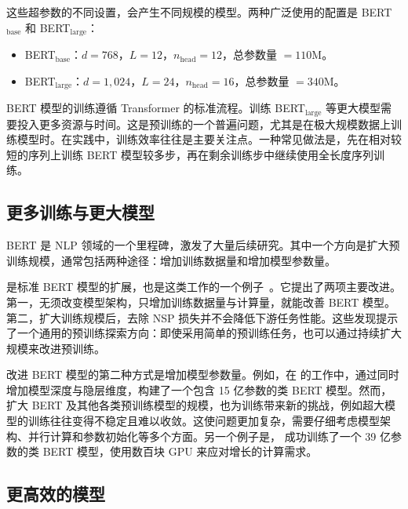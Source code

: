这些超参数的不同设置，会产生不同规模的模型。两种广泛使用的配置是 BERT$_{\mathrm{base}}$ 和 BERT$_{\mathrm{large}}$：

\begin{itemize}
\item \vspace{0.5em} BERT$_{\mathrm{base}}$：$d=768$，$L=12$，$n_{\mathrm{head}}=12$，总参数量 $=110$M。
\item \vspace{0.3em} BERT$_{\mathrm{large}}$：$d=1,024$，$L=24$，$n_{\mathrm{head}}=16$，总参数量 $=340$M。
\end{itemize}
\vspace{0.3em}

BERT 模型的训练遵循 Transformer 的标准流程。训练 BERT$_{\mathrm{large}}$ 等更大模型需要投入更多资源与时间。这是预训练的一个普遍问题，尤其是在极大规模数据上训练模型时。在实践中，训练效率往往是主要关注点。一种常见做法是，先在相对较短的序列上训练 BERT 模型较多步，再在剩余训练步中继续使用全长度序列训练。

\subsection{更多训练与更大模型}

\noindent BERT 是 NLP 领域的一个里程碑，激发了大量后续研究。其中一个方向是扩大预训练规模，通常包括两种途径：增加训练数据量和增加模型参数量。

 是标准 BERT 模型的扩展，也是这类工作的一个例子~\cite{liu-etal:2019roberta}。它提出了两项主要改进。第一，无须改变模型架构，只增加训练数据量与计算量，就能改善 BERT 模型。第二，扩大训练规模后，去除 NSP 损失并不会降低下游任务性能。这些发现提示了一个通用的预训练探索方向：即使采用简单的预训练任务，也可以通过持续扩大规模来改进预训练。

改进 BERT 模型的第二种方式是增加模型参数量。例如，在 \citet{he-etal:2021deberta} 的工作中，通过同时增加模型深度与隐层维度，构建了一个包含 15 亿参数的类 BERT 模型。然而，扩大 BERT 及其他各类预训练模型的规模，也为训练带来新的挑战，例如超大模型的训练往往变得不稳定且难以收敛。这使问题更加复杂，需要仔细考虑模型架构、并行计算和参数初始化等多个方面。另一个例子是，\citet{shoeybi-etal:2019megatron} 成功训练了一个 39 亿参数的类 BERT 模型，使用数百块 GPU 来应对增长的计算需求。

\subsection{更高效的模型}

